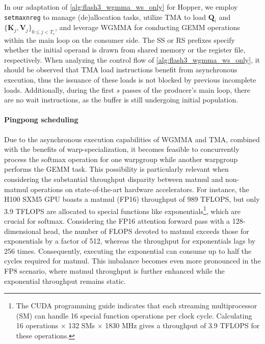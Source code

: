 In our adaptation of \cref{alg:flash3_wgmma_ws_only} for Hopper, we employ \verb|setmaxnreg| to manage (de)allocation tasks, utilize TMA to load $\mathbf{Q}_i$ and $\{ \mathbf{K}_j, \mathbf{V}_j \}_{0 \leq j < T_c}$, and leverage WGMMA for conducting GEMM operations within the main loop on the consumer side. The SS or RS prefixes specify whether the initial operand is drawn from shared memory or the register file, respectively. When analyzing the control flow of \cref{alg:flash3_wgmma_ws_only}, it should be observed that TMA load instructions benefit from asynchronous execution, thus the issuance of these loads is not blocked by previous incomplete loads. Additionally, during the first $s$ passes of the producer’s main loop, there are no wait instructions, as the buffer is still undergoing initial population.

\paragraph{Pingpong scheduling} Due to the asynchronous execution capabilities of WGMMA and TMA, combined with the benefits of warp-specialization, it becomes feasible to concurrently process the softmax operation for one warpgroup while another warpgroup performs the GEMM task. This possibility is particularly relevant when considering the substantial throughput disparity between matmul and non-matmul operations on state-of-the-art hardware accelerators. For instance, the H100 SXM5 GPU boasts a matmul (FP16) throughput of 989 TFLOPS, but only 3.9 TFLOPS are allocated to special functions like exponentials\footnote{The CUDA programming guide indicates that each streaming multiprocessor (SM) can handle 16 special function operations per clock cycle. Calculating 16 operations $\times$ 132 SMs $\times$ 1830 MHz gives a throughput of 3.9 TFLOPS for these operations.}, which are crucial for softmax. Considering the FP16 attention forward pass with a 128-dimensional head, the number of FLOPS devoted to matmul exceeds those for exponentials by a factor of 512, whereas the throughput for exponentials lags by 256 times. Consequently, executing the exponential can consume up to half the cycles required for matmul. This imbalance becomes even more pronounced in the FP8 scenario, where matmul throughput is further enhanced while the exponential throughput remains static.

